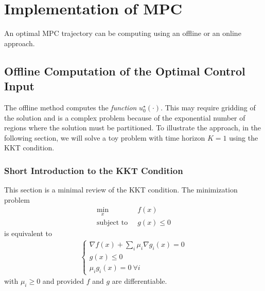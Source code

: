 
\section{Implementation of MPC}
\label{sec:implementation-MPC}

An optimal MPC trajectory can be computing using an offline or an online approach.

\subsection{Offline Computation of the Optimal Control Input}
\label{sec:offline-computation-MPC}

The offline method computes the \emph{function} $u_0^\star(\cdot)$. This may require gridding of the solution and is a complex problem because of the exponential number of regions where the solution must be partitioned. To illustrate the approach, in the following section, we will solve a toy problem with time horizon $K=1$ using the KKT condition.

\subsubsection{Short Introduction to the KKT Condition}
\label{sec:short-intro-KKT}

This section is a minimal review of the KKT condition. The minimization problem
\begin{align*}
  \min_x &\ f(x) \\
  \text{subject to } &\ g(x) \le 0
\end{align*}
is equivalent to
\begin{align*}
  \begin{cases}
    \nabla f(x) + \sum_i \mu_i \nabla g_i(x) = 0 \\
    g(x) \le 0 \\
    \mu_i g_i(x) = 0\ \forall i
  \end{cases}
\end{align*}
with $\mu_i\ge 0$ and provided $f$ and $g$ are differentiable.

